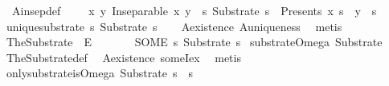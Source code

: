 \begin{isabellebody}
\ \ A{}{\isacharunderscore}{\kern0pt}insep{\isacharunderscore}{\kern0pt}def{\isacharcolon}{\kern0pt}\ \ \ \ \ {\isachardoublequoteopen}{\isasymforall}x\ y{\isachardot}{\kern0pt}\ Inseparable\ x\ y\ {\isasymlongleftrightarrow}\ {\isacharparenleft}{\kern0pt}{\isasymexists}s{\isachardot}{\kern0pt}\ Substrate\ s\ {\isasymand}\ Presents\ x\ s\ {\isasymand}\ y\ {\isacharequal}{\kern0pt}\ s{\isacharparenright}{\kern0pt}{\isachardoublequoteclose}\isanewline
\isanewline
{}\isamarkupfalse%
\ unique{\isacharunderscore}{\kern0pt}substrate{\isacharcolon}{\kern0pt}\ {\isachardoublequoteopen}{\isasymexists}{\isacharbang}{\kern0pt}s{\isachardot}{\kern0pt}\ Substrate\ s{\isachardoublequoteclose}\isanewline
%
\isadelimproof
\ \ %
\endisadelimproof
%
\isatagproof
{}\isamarkupfalse%
\ A{}{\isacharunderscore}{\kern0pt}existence\ A{}{\isacharunderscore}{\kern0pt}uniqueness\ \isamarkupfalse%
\ {\isacharparenleft}{\kern0pt}metis{\isacharparenright}{\kern0pt}%
\endisatagproof
{\isafoldproof}%
%
\isadelimproof
\isanewline
%
\endisadelimproof
\isanewline
{}\isamarkupfalse%
\ TheSubstrate\ {\isacharcolon}{\kern0pt}{\isacharcolon}{\kern0pt}\ {\isachardoublequoteopen}E{\isachardoublequoteclose}\ \ {\isacharparenleft}{\kern0pt}{\isachardoublequoteopen}{\isasymOmega}{\isachardoublequoteclose}{\isacharparenright}{\kern0pt}\isanewline
\ \ \ {\isachardoublequoteopen}{\isasymOmega}\ {\isacharequal}{\kern0pt}\ {\isacharparenleft}{\kern0pt}SOME\ s{\isachardot}{\kern0pt}\ Substrate\ s{\isacharparenright}{\kern0pt}{\isachardoublequoteclose}\isanewline
\isanewline
{}\isamarkupfalse%
\ substrate{\isacharunderscore}{\kern0pt}Omega{\isacharcolon}{\kern0pt}\ {\isachardoublequoteopen}Substrate\ {\isasymOmega}{\isachardoublequoteclose}\isanewline
%
\isadelimproof
\ \ %
\endisadelimproof
%
\isatagproof
{}\isamarkupfalse%
\ TheSubstrate{\isacharunderscore}{\kern0pt}def\ \isamarkupfalse%
\ A{}{\isacharunderscore}{\kern0pt}existence\ someI{\isacharunderscore}{\kern0pt}ex\ \isamarkupfalse%
\ metis%
\endisatagproof
{\isafoldproof}%
%
\isadelimproof
\isanewline
%
\endisadelimproof
\isanewline
{}\isamarkupfalse%
\ only{\isacharunderscore}{\kern0pt}substrate{\isacharunderscore}{\kern0pt}is{\isacharunderscore}{\kern0pt}Omega{\isacharcolon}{\kern0pt}\ {\isachardoublequoteopen}Substrate\ s\ {\isasymLongrightarrow}\ s\ {\isacharequal}{\kern0pt}\ {\isasymOmega}{\isachardoublequoteclose}\isanewline

\end{isabellebody}
